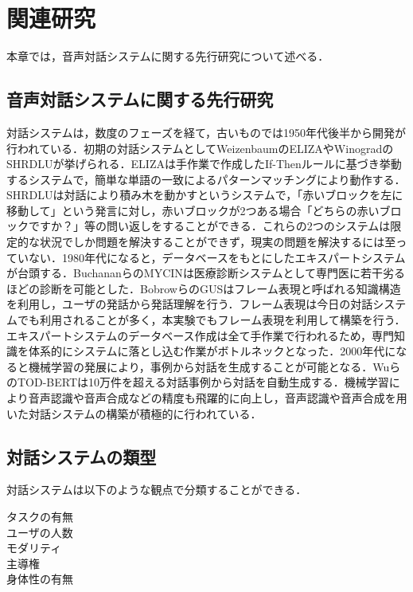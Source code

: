 \section{関連研究}
\label{関連研究}
本章では，音声対話システムに関する先行研究について述べる．

\subsection{音声対話システムに関する先行研究}
\label{音声対話システムに関する先行研究}

対話システムは，数度のフェーズを経て，古いものでは1950年代後半から開発が行われている．\cite{higashinaka2020python}初期の対話システムとしてWeizenbaumのELIZA\cite{weizenbaum1966eliza}やWinogradのSHRDLU\cite{winograd1971shrdlu}が挙げられる．ELIZAは手作業で作成したIf-Thenルールに基づき挙動するシステムで，簡単な単語の一致によるパターンマッチングにより動作する．SHRDLUは対話により積み木を動かすというシステムで，「赤いブロックを左に移動して」という発言に対し，赤いブロックが2つある場合「どちらの赤いブロックですか？」等の問い返しをすることができる．これらの2つのシステムは限定的な状況でしか問題を解決することができず，現実の問題を解決するには至っていない．1980年代になると，データベースをもとにしたエキスパートシステムが台頭する．BuchananらのMYCIN\cite{buchanan1984rule}は医療診断システムとして専門医に若干劣るほどの診断を可能とした．BobrowらのGUS\cite{bobrow1977gus}はフレーム表現と呼ばれる知識構造を利用し，ユーザの発話から発話理解を行う．フレーム表現は今日の対話システムでも利用されることが多く，本実験でもフレーム表現を利用して構築を行う．エキスパートシステムのデータベース作成は全て手作業で行われるため，専門知識を体系的にシステムに落とし込む作業がボトルネックとなった．2000年代になると機械学習の発展により，事例から対話を生成することが可能となる．WuらのTOD-BERT\cite{wu2020tod}は10万件を超える対話事例から対話を自動生成する．機械学習により音声認識や音声合成などの精度も飛躍的に向上し，音声認識や音声合成を用いた対話システムの構築が積極的に行われている．\cite{higsshinakalive}

\subsection{対話システムの類型}
\label{対話システムの類型}
対話システムは以下のような観点で分類することができる．
\begin{description}
    \item[タスクの有無]
    \item[ユーザの人数]
    \item[モダリティ]
    \item[主導権]
    \item[身体性の有無]   
\end{description}
